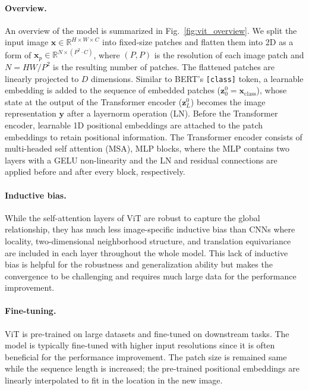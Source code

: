 \documentclass[10pt,twocolumn,letterpaper]{article}
\begin{document}
\paragraph{Overview.}
An overview of the model is summarized in Fig.~\ref{fig:vit_overview}.
We split the input image $\mathbf{x} \in \mathbb{R}^{H \times W \times C}$ into fixed-size patches and flatten them into 2D as a form of $\mathbf{x}_p \in \mathbb{R}^{N \times (P^2 \cdot C)}$, where $(P,P)$ is the resolution of each image patch and $N=HW/P^2$ is the resulting number of patches.
The flattened patches are linearly projected to $D$ dimensions.
Similar to BERT's \texttt{[class]} token, a learnable embedding is added to the sequence of embedded patches ($\mathbf{z}^0_0 = \mathbf{x}_{\mathrm{class}}$), whose state at the output of the Transformer encoder ($\mathbf{z}^0_L$) becomes the image representation $\mathbf{y}$ after a layernorm operation (LN).
Before the Transformer encoder, learnable 1D positional embeddings are attached to the patch embeddings to retain positional information.
The Transformer encoder consists of multi-headed self attention (MSA), MLP blocks, where the MLP contains two layers with a GELU non-linearity and the LN and residual connections are applied before and after every block, respectively.

\paragraph{Inductive bias.}
While the self-attention layers of ViT are robust to capture the global relationship, they has much less image-specific inductive bias than CNNs where locality, two-dimensional neighborhood structure, and translation equivariance are included in each layer throughout the whole model.
This lack of inductive bias is helpful for the robustness and generalization ability but makes the convergence to be challenging and requires much large data for the performance improvement.

\paragraph{Fine-tuning.}
ViT is pre-trained on large datasets and fine-tuned on downstream tasks.
The model is typically fine-tuned with higher input resolutions since it is often beneficial for the performance improvement.
The patch size is remained same while the sequence length is increased; the pre-trained positional embeddings are linearly interpolated to fit in the location in the new image.
\end{document}
